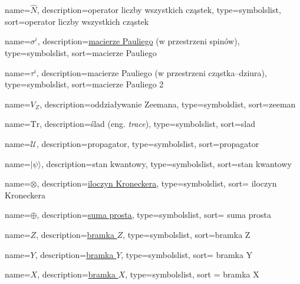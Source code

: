 {
    name=\ensuremath{\hat N},
    description={operator liczby wszystkich cząstek},
    type=symbolslist,
    sort=operator liczby wszystkich cząstek
}


{
    name=\ensuremath{\sigma^i},
    description={\href{https://pl.wikipedia.org/wiki/Macierze_Pauliego}{macierze Pauliego} (w przestrzeni spinów)},
    type=symbolslist,
    sort=macierze Pauliego
}

{
    name=\ensuremath{\tau^i},
    description={macierze Pauliego (w przestrzeni cząstka--dziura)},
    type=symbolslist,
    sort=macierze Pauliego 2
}

{
    name=\ensuremath{V_Z},
    description={oddziaływanie Zeemana},
    type=symbolslist,
    sort=zeeman
}


{
    name=\ensuremath{\mathrm{Tr}},
    description={ślad (eng. \textit{trace})},
    type=symbolslist,
    sort=slad
}

{
    name=\ensuremath{\mathcal{U}},
    description={propagator},
    type=symbolslist,
    sort=propagator
}

{
    name=\ensuremath{|\psi\rangle},
    description={stan kwantowy},
    type=symbolslist,
    sort=stan kwantowy
}


{
    name=\ensuremath{\otimes},
    description={\href{https://pl.wikipedia.org/wiki/Iloczyn_Kroneckera}{iloczyn Kroneckera}},
    type=symbolslist,
    sort= iloczyn Kroneckera
}

{
    name=\ensuremath{\oplus},
    description={\href{https://pl.wikipedia.org/wiki/Suma_prosta_przestrzeni_liniowych}{suma prosta}},
    type=symbolslist,
    sort= suma prosta
}

{
    name=\ensuremath{Z},
    description={\href{https://en.wikipedia.org/wiki/Quantum_logic_gate\#Pauli-Z_(\%7F'\%22\%60UNIQ--postMath-00000022-QINU\%60\%22'\%7F)_gate}{bramka $Z$}},
    type=symbolslist,
    sort=bramka Z
}

{
    name=\ensuremath{Y},
    description={\href{https://en.wikipedia.org/wiki/Quantum_logic_gate\#Pauli-Y_gate}{bramka $Y$}},
    type=symbolslist,
    sort= bramka Y
}

{
    name=\ensuremath{X},
    description={\href{https://en.wikipedia.org/wiki/Quantum_logic_gate\#Pauli-X_gate}{bramka $X$}},
    type=symbolslist,
    sort = bramka X
}

